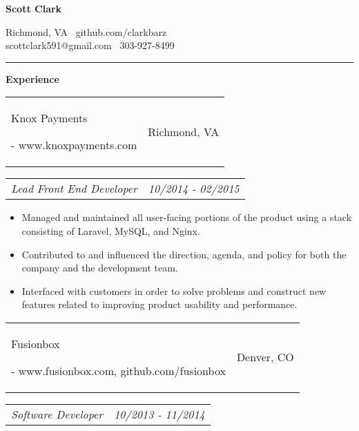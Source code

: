 \documentclass[11pt]{article}
\makeatletter
\newcommand{\headerrow}[2]
{\begin{tabular*}{\linewidth}{l@{\extracolsep{\fill}}r}
	#1 &
	#2 \\
\end{tabular*}}
\makeatother
\begin{document}
\begin{center}
	\begin{huge}
		\bf Scott Clark
	\end{huge}
	
	\large Richmond, VA \textbullet\ github.com/clarkbarz \\
	\large scottclark591@gmail.com \textbullet\ 303-927-8499 \\
\end{center}

\vspace{-0.5em}
\hrule
\vspace{0.8em}

\begin{LARGE}
	\bf Experience
\end{LARGE}

\vspace{0.5em}
\headerrow
	{\begin{Large}Knox Payments\end{Large} - www.knoxpayments.com}
	{Richmond, VA}
\headerrow
	{\textit{Lead Front End Developer}}
	{\textit{10/2014 - 02/2015}}
	
\vspace{-0.8em}
\begin{itemize}
	\item Managed and maintained all user-facing portions of the product using a stack consisting of Laravel, MySQL, and Nginx.
	\vspace{-0.6em}
	\item Contributed to and influenced the direction, agenda, and policy for both the company and the development team.
	\vspace{-0.6em}
	\item Interfaced with customers in order to solve problems and construct new features related to improving product usability and performance.
\end{itemize}

\vspace{-0.6em}

\vspace{0.5em}
\headerrow
	{\begin{Large}Fusionbox\end{Large} - www.fusionbox.com, github.com/fusionbox}
	{Denver, CO}
\headerrow
	{\textit{Software Developer}}
	{\textit{10/2013 - 11/2014}}
	
\end{document}
